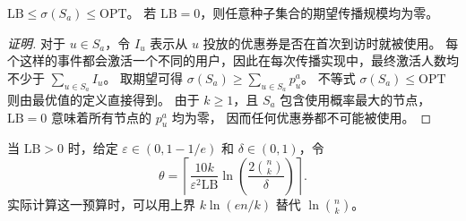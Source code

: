 \begin{lemma}[传播规模下界]
\label{lem:lower-bound}
$\mathrm{LB}\le\sigma(S_a)\le\mathrm{OPT}$。
若 $\mathrm{LB}=0$，则任意种子集合的期望传播规模均为零。
\end{lemma}
\begin{proof}[证明]\renewcommand{\qedsymbol}{}
对于 $u\in S_a$，令 $I_u$ 表示从 $u$ 投放的优惠券是否在首次到访时就被使用。
每个这样的事件都会激活一个不同的用户，因此在每次传播实现中，最终激活人数均不少于
$\sum_{u\in S_a}I_u$。
取期望可得 $\sigma(S_a)\ge\sum_{u\in S_a}p_u^a$。
不等式 $\sigma(S_a)\le\mathrm{OPT}$ 则由最优值的定义直接得到。
由于 $k\ge1$，且 $S_a$ 包含使用概率最大的节点，$\mathrm{LB}=0$ 意味着所有节点的 $p_u^a$ 均为零，
因而任何优惠券都不可能被使用。
\end{proof}

当 $\mathrm{LB}>0$ 时，给定 $\varepsilon\in(0,1-1/e)$ 和 $\delta\in(0,1)$，令
\begin{equation}
\label{eq:sample-budget}
 \theta=\left\lceil
 \frac{10k}{\varepsilon^2\mathrm{LB}}
 \ln\left(\frac{2\binom nk}{\delta}\right)
 \right\rceil.
\end{equation}
实际计算这一预算时，可以用上界 $k\ln(en/k)$ 替代 $\ln\binom nk$。

